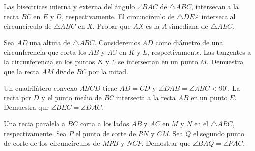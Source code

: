 \begin{section-problem}
    Las bisectrices interna y externa del ángulo $\angle BAC$ de $\triangle ABC$, intersecan a la recta $BC$ en $E$ y $D$, respectivamente.
    El circuncírculo de $\triangle DEA$ interseca al circuncírculo de $\triangle ABC$ en $X$.
    Probar que $AX$ es la $A$-simediana de $\triangle ABC$.
\end{section-problem}

\begin{section-problem}
    Sea $AD$ una altura de $\triangle ABC$.
    Consideremos $AD$ como diámetro de una circunferencia que corta los $AB$ y $AC$ en $K$ y $L$, respectivamente.
    Las tangentes a la circunferencia en los puntos $K$ y $L$ se intersectan en un punto $M$.
    Demuestra que la recta $AM$ divide $BC$ por la mitad.
\end{section-problem}

\begin{section-problem}
    Un cuadrilátero convexo $ABCD$ tiene $AD = CD$ y $\angle DAB = \angle ABC < 90^\circ$.
    La recta por $D$ y el punto medio de $BC$ intersecta a la recta $AB$ en un punto $E$.
    Demuestra qur $\angle BEC = \angle DAC$.
\end{section-problem}

\begin{section-problem}
    Una recta paralela a $BC$ corta a los lados $AB$ y $AC$ en $M$ y $N$ en el $\triangle ABC$, respectivamente.
    Sea $P$ el punto de corte de $BN$ y $CM$.
    Sea $Q$ el segundo punto de corte de los circuncírculos de $MPB$ y $NCP$.
    Demostrar que $\angle BAQ = \angle PAC$.
\end{section-problem}